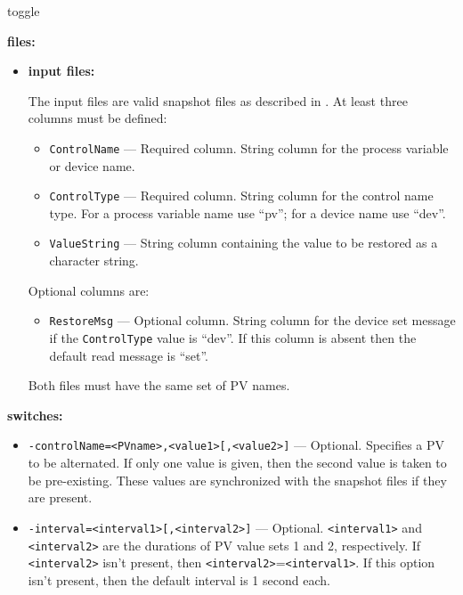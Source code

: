 \begin{sddsprog}{toggle}
\item {\bf files:}
\begin{itemize}
\item {\bf input files:}\par
The input files are valid snapshot files as described in . At least three
columns must be defined:
\begin{itemize}
        \item {\tt ControlName} --- Required column. String column for the process variable or device name.
        \item {\tt ControlType} --- Required column. String column for the control name type. For a 
                process variable name use ``pv''; for a device name use ``dev''.
        \item {\tt ValueString} --- String column containing the value to be restored as a character string.
\end{itemize}
Optional columns are:
\begin{itemize}
        \item {\tt RestoreMsg} --- Optional column. String column for the device set message if 
                the {\tt ControlType} value is ``dev''.
                If this column is absent then the default read message is ``set''.
\end{itemize}
        Both files must have the same set of PV names.
\end{itemize}
%
\item {\bf switches:}
%
%
    \begin{itemize}
%
%
        \item {\tt -controlName=<PVname>,<value1>[,<value2>]} --- Optional. Specifies a PV to be
                alternated. If only one value is given, then the second value
                is taken to be pre-existing. These values are synchronized with
                the snapshot files if they are present.
        \item {\tt -interval=<interval1>[,<interval2>]} ---  Optional. \verb+<interval1>+ and \verb+<interval2>+
                 are the durations of PV value sets 1 and 2, respectively.
                 If \verb+<interval2>+ isn't present, then \verb+<interval2>+=\verb+<interval1>+.
                 If this option isn't present, then the default interval is 1 second each.

\end{itemize}
\end{sddsprog}
